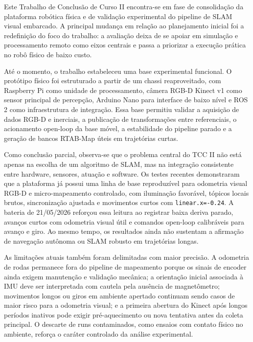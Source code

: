 Este Trabalho de Conclusão de Curso II encontra-se em fase de consolidação da plataforma robótica física e de validação experimental do pipeline de SLAM visual embarcado. A principal mudança em relação ao planejamento inicial foi a redefinição do foco do trabalho: a avaliação deixa de se apoiar em simulação e processamento remoto como eixos centrais e passa a priorizar a execução prática no robô físico de baixo custo.

Até o momento, o trabalho estabeleceu uma base experimental funcional. O protótipo físico foi estruturado a partir de um chassi reaproveitado, com Raspberry Pi como unidade de processamento, câmera RGB-D Kinect v1 como sensor principal de percepção, Arduino Nano para interface de baixo nível e ROS 2 como infraestrutura de integração. Essa base permitiu validar a aquisição de dados RGB-D e inerciais, a publicação de transformações entre referenciais, o acionamento open-loop da base móvel, a estabilidade do pipeline parado e a geração de bancos RTAB-Map úteis em trajetórias curtas.

Como conclusão parcial, observa-se que o problema central do TCC II não está apenas na escolha de um algoritmo de SLAM, mas na integração consistente entre hardware, sensores, atuação e software. Os testes recentes demonstraram que a plataforma já possui uma linha de base reproduzível para odometria visual RGB-D e micro-mapeamento controlado, com iluminação favorável, tópicos locais brutos, sincronização ajustada e movimentos curtos com \texttt{linear.x=-0.24}. A bateria de 21/05/2026 reforçou essa leitura ao registrar baixa deriva parado, avanços curtos com odometria visual útil e comandos open-loop calibráveis para avanço e giro. Ao mesmo tempo, os resultados ainda não sustentam a afirmação de navegação autônoma ou SLAM robusto em trajetórias longas.

As limitações atuais também foram delimitadas com maior precisão. A odometria de rodas permanece fora do pipeline de mapeamento porque os sinais de encoder ainda exigem manutenção e validação mecânica; a orientação inicial associada à IMU deve ser interpretada com cautela pela ausência de magnetômetro; movimentos longos ou giros em ambiente apertado continuam sendo casos de maior risco para a odometria visual; e a primeira abertura do Kinect após longos períodos inativos pode exigir pré-aquecimento ou nova tentativa antes da coleta principal. O descarte de runs contaminados, como ensaios com contato físico no ambiente, reforça o caráter controlado da análise experimental.

